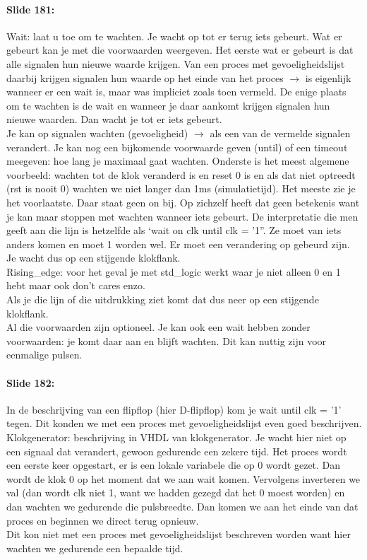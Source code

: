 \documentclass[10pt,a4paper]{book}
\begin{document}
\paragraph{Slide 181:} Wait: laat u toe om te wachten. Je wacht op tot er terug iets gebeurt. Wat er gebeurt kan je met die voorwaarden weergeven. Het eerste wat er gebeurt is dat alle signalen hun nieuwe waarde krijgen. Van een proces met gevoeligheidslijst daarbij krijgen signalen hun waarde op het einde van het proces $\rightarrow$ is eigenlijk wanneer er een wait is, maar was impliciet zoals toen vermeld. De enige plaats om te wachten is de wait en wanneer je daar aankomt krijgen signalen hun nieuwe waarden. Dan wacht je tot er iets gebeurt.\\
Je kan op signalen wachten (gevoeligheid) $\rightarrow$ als een van de vermelde signalen verandert. Je kan nog een bijkomende voorwaarde geven (until) of een timeout meegeven: hoe lang je maximaal gaat wachten. Onderste is het meest algemene voorbeeld: wachten tot de klok veranderd is en reset 0 is en als dat niet optreedt (rst is nooit 0) wachten we niet langer dan 1ms (simulatietijd). Het meeste zie je het voorlaatste. Daar staat geen on bij. Op zichzelf heeft dat geen betekenis want je kan maar stoppen met wachten wanneer iets gebeurt. De interpretatie die men geeft aan die lijn is hetzelfde als `wait on clk until clk = '1''. Ze moet van iets anders komen en moet 1 worden wel. Er moet een verandering op gebeurd zijn. Je wacht dus op een stijgende klokflank.\\
Rising\_edge: voor het geval je met std\_logic werkt waar je niet alleen 0 en 1 hebt maar ook don't cares enzo.\\
Als je die lijn of die uitdrukking ziet komt dat dus neer op een stijgende klokflank.\\
Al die voorwaarden zijn optioneel. Je kan ook een wait hebben zonder voorwaarden: je komt daar aan en blijft wachten. Dit kan nuttig zijn voor eenmalige pulsen. 

\paragraph{Slide 182:} In de beschrijving van een flipflop (hier D-flipflop) kom je wait until clk = '1' tegen. Dit konden we met een proces met gevoeligheidslijst even goed beschrijven.\\
Klokgenerator: beschrijving in VHDL van klokgenerator. Je wacht hier niet op een signaal dat verandert, gewoon gedurende een zekere tijd. Het proces wordt een eerste keer opgestart, er is een lokale variabele die op 0 wordt gezet. Dan wordt de klok 0 op het moment dat we aan wait komen. Vervolgens inverteren we val (dan wordt clk niet 1, want we hadden gezegd dat het 0 moest worden) en dan wachten we gedurende die pulsbreedte. Dan komen we aan het einde van dat proces en beginnen we direct terug opnieuw.\\
Dit kon niet met een proces met gevoeligheidslijst beschreven worden want hier wachten we gedurende een bepaalde tijd.
\end{document}
